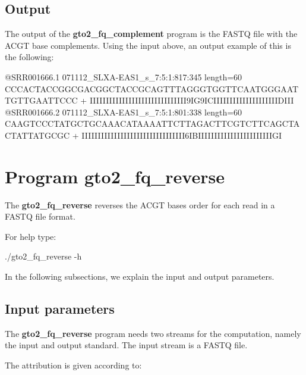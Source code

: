 \documentclass[11pt,]{krantz}
\newenvironment{Shaded}{\begin{snugshade}}{\end{snugshade}}
\newcommand{\ExtensionTok}[1]{#1}
\newcommand{\NormalTok}[1]{#1}
\begin{document}
\subsection*{Output}\label{output-21}


The output of the \textbf{gto2\_fq\_complement} program is the FASTQ
file with the ACGT base complements. Using the input above, an output
example of this is the following:

\begin{Shaded}
\begin{Highlighting}[]
\ExtensionTok{@SRR001666.1}\NormalTok{ 071112_SLXA-EAS1_s_7:5:1:817:345 length=60}
\ExtensionTok{CCCACTACCGGCGACGGCTACCGCAGTTTAGGGTGGTTCAATGGGAATTGTTGAATTCCC}
\ExtensionTok{+}
\ExtensionTok{IIIIIIIIIIIIIIIIIIIIIIIIIIIIII9IG9ICIIIIIIIIIIIIIIIIIIIIDIII}
\ExtensionTok{@SRR001666.2}\NormalTok{ 071112_SLXA-EAS1_s_7:5:1:801:338 length=60}
\ExtensionTok{CAAGTCCCTATGCTGCAAACATAAAATTCTTAGACTTCGTCTTCAGCTACTATTATGCGC}
\ExtensionTok{+}
\ExtensionTok{IIIIIIIIIIIIIIIIIIIIIIIIIIIIIIII6IBIIIIIIIIIIIIIIIIIIIIIIIGI}
\end{Highlighting}
\end{Shaded}

\section{Program gto2\_fq\_reverse}\label{program-gto2_fq_reverse}

The \textbf{gto2\_fq\_reverse} reverses the ACGT bases order for each
read in a FASTQ file format.

For help type:

\begin{Shaded}
\begin{Highlighting}[]
\ExtensionTok{./gto2_fq_reverse}\NormalTok{ -h}
\end{Highlighting}
\end{Shaded}

In the following subsections, we explain the input and output
parameters.

\subsection*{Input parameters}\label{input-parameters-22}


The \textbf{gto2\_fq\_reverse} program needs two streams for the
computation, namely the input and output standard. The input stream is a
FASTQ file.

The attribution is given according to:
\end{document}
